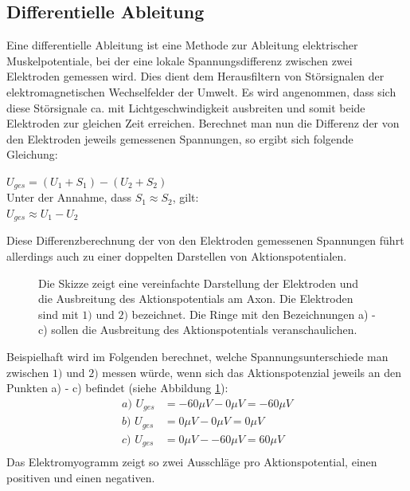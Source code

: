 \documentclass[11pt]{article}
\begin{document}
\subsection{Differentielle Ableitung}\label{differentiell}
Eine differentielle Ableitung ist eine Methode zur Ableitung elektrischer Muskelpotentiale, bei der eine lokale Spannungsdifferenz zwischen zwei Elektroden gemessen wird. Dies dient dem Herausfiltern von Störsignalen der elektromagnetischen Wechselfelder der Umwelt. Es wird angenommen, dass sich diese Störsignale ca. mit Lichtgeschwindigkeit ausbreiten und somit beide Elektroden zur gleichen Zeit erreichen. Berechnet man nun die Differenz der von den Elektroden jeweils gemessenen Spannungen, so ergibt sich folgende Gleichung:
\begin{center}
$U_{ges}= (U_1+S_1) - (U_2 + S_2)$ \\

Unter der Annahme, dass $S_1 \approx S_2$, gilt: \\

$U_{ges} \approx U_1 - U_2$
\end{center}

Diese Differenzberechnung der von den Elektroden gemessenen Spannungen führt allerdings auch zu einer doppelten Darstellen von Aktionspotentialen.
\begin{figure}[H]
\caption{Die Skizze zeigt eine vereinfachte Darstellung der Elektroden und die Ausbreitung des Aktionspotentials am Axon. Die Elektroden sind mit $1)$ und $2)$ bezeichnet. Die Ringe mit den Bezeichnungen a) - c) sollen die Ausbreitung des Aktionspotentials veranschaulichen.}
\label{diff}
\end{figure}
Beispielhaft wird im Folgenden berechnet, welche Spannungsunterschiede man zwischen $1)$ und $2)$ messen würde, wenn sich das Aktionspotenzial jeweils an den Punkten a) - c) befindet (siehe Abbildung \ref{diff}):
\begin{align*}
a)\,\, U_{ges} &= -60\mu V - 0\mu V =  -60\mu V\\
b)\,\, U_{ges} &= 0\mu V - 0\mu V =  0\mu V\\
c)\,\, U_{ges} &= 0\mu V - -60\mu V =  60\mu V\\
\end{align*}
Das Elektromyogramm zeigt so zwei Ausschläge pro Aktionspotential, einen positiven und einen negativen. 
\end{document}
